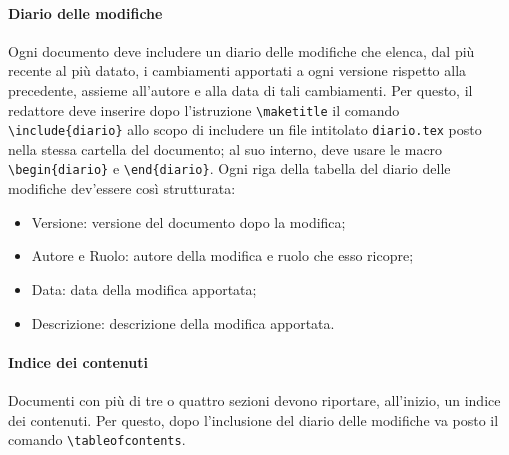 \paragraph{Diario delle modifiche} Ogni documento deve includere un diario delle modifiche che elenca, dal più recente al più datato, i cambiamenti apportati a ogni versione rispetto alla precedente, assieme all'autore e alla data di tali cambiamenti. Per questo, il redattore deve inserire dopo l'istruzione \texttt{\textbackslash maketitle} il comando \texttt{\textbackslash include\{diario\}} allo scopo di includere un file intitolato \texttt{diario.tex} posto nella stessa cartella del documento; al suo interno, deve usare le macro \texttt{\textbackslash begin\{diario\}} e \texttt{\textbackslash end\{diario\}}. Ogni riga della tabella del diario delle modifiche dev'essere così strutturata:
\begin{itemize}
 \item Versione: versione del documento dopo la modifica;
 \item Autore e Ruolo: autore della modifica e ruolo che esso ricopre;
 \item Data: data della modifica apportata;
 \item Descrizione: descrizione della modifica apportata.
\end{itemize}
\paragraph{Indice dei contenuti} Documenti con più di tre o quattro sezioni devono riportare, all'inizio, un indice dei contenuti. Per questo, dopo l'inclusione del diario delle modifiche va posto il comando \texttt{\textbackslash tableofcontents}.
